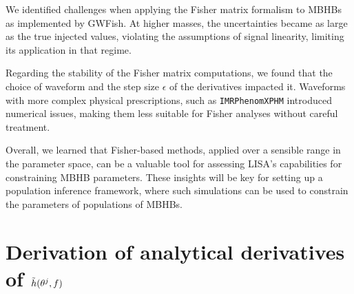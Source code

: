 \documentclass[a4paper,12pt]{article}
\begin{document}
We identified challenges when applying the Fisher matrix formalism to MBHBs as implemented by GWFish. At higher masses, the uncertainties became as large as the true injected values, violating the assumptions of signal linearity, limiting its application in that regime.

Regarding the stability of the Fisher matrix computations, we found that the choice of waveform and the step size $\epsilon$ of the derivatives impacted it. Waveforms with more complex physical prescriptions, such as \texttt{IMRPhenomXPHM} introduced numerical issues, making them less suitable for Fisher analyses without careful treatment.

Overall, we learned that Fisher-based methods, applied over a sensible range in the parameter space, can be a valuable tool for assessing LISA's capabilities for constraining MBHB parameters. These insights will be key for setting up a population inference framework, where such simulations can be used to constrain the parameters of populations of MBHBs.

\appendix
\section{Derivation of analytical derivatives of $\Tilde{h}(\theta^{j},f)$}
\label{app:AnDerivWaveform}
\end{document}
